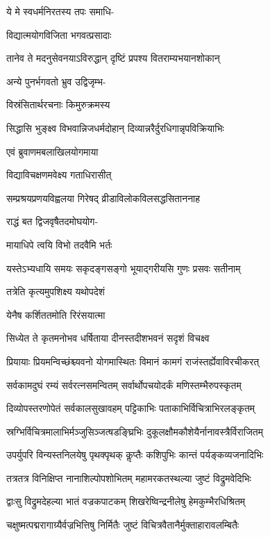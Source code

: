 ये मे स्वधर्मनिरतस्य तपः समाधि-

विद्यात्मयोगविजिता भगवत्प्रसादाः

\twolineshloka
{तानेव ते मदनुसेवनयाऽविरुद्धान्}
{दृष्टिं प्रपश्य वितराम्यभयानशोकान्}%

अन्ये पुनर्भगवतो भ्रुव उद्विजृम्भ-

विस्रंसितार्थरचनाः किमुरुक्रमस्य

\twolineshloka
{सिद्धासि भुङ्क्ष्व विभवान्निजधर्मदोहान्}
{दिव्यान्नरैर्दुरधिगान्नृपविक्रियाभिः}%

एवं ब्रुवाणमबलाखिलयोगमाया

विद्याविचक्षणमवेक्ष्य गताधिरासीत्

\twolineshloka
{सम्प्रश्रयप्रणयविह्वलया गिरेषद्}
{व्रीडाविलोकविलसद्धसिताननाह}%


राद्धं बत द्विजवृषैतदमोघयोग-

मायाधिपे त्वयि विभो तदवैमि भर्तः

\twolineshloka
{यस्तेऽभ्यधायि समयः सकृदङ्गसङ्गो}
{भूयाद्गरीयसि गुणः प्रसवः सतीनाम्}%

तत्रेति कृत्यमुपशिक्ष्य यथोपदेशं

येनैष कर्शिततमोति रिरंसयात्मा

\twolineshloka
{सिध्येत ते कृतमनोभव धर्षिताया}
{दीनस्तदीशभवनं सदृशं विचक्ष्व}%


\twolineshloka
{प्रियायाः प्रियमन्विच्छंश्च्यवनो योगमास्थितः}
{विमानं कामगं राजंस्तर्ह्येवाविरचीकरत्}%

\twolineshloka
{सर्वकामदुघं रम्यं सर्वरत्नसमन्वितम्}
{सर्वार्थोपचयोदर्कं मणिस्तम्भैरुपस्कृतम्}%

\twolineshloka
{दिव्योपस्तरणोपेतं सर्वकालसुखावहम्}
{पट्टिकाभिः पताकाभिर्विचित्राभिरलङ्कृतम्}%

\twolineshloka
{स्रग्भिर्विचित्रमालाभिर्मञ्जुसिञ्जत्षडङ्घ्रिभिः}
{दुकूलक्षौमकौशेयैर्नानावस्त्रैर्विराजितम्}%

\twolineshloka
{उपर्युपरि विन्यस्तनिलयेषु पृथक्पृथक्}
{कॢप्तैः कशिपुभिः कान्तं पर्यङ्कव्यजनादिभिः}%

\twolineshloka
{तत्रतत्र विनिक्षिप्त नानाशिल्पोपशोभितम्}
{महामरकतस्थल्या जुष्टं विद्रुमवेदिभिः}%

\twolineshloka
{द्वाःसु विद्रुमदेहल्या भातं वज्रकपाटकम्}
{शिखरेष्विन्द्रनीलेषु हेमकुम्भैरधिश्रितम्}%

\twolineshloka
{चक्षुष्मत्पद्मरागाग्र्यैर्वज्रभित्तिषु निर्मितैः}
{जुष्टं विचित्रवैतानैर्मुक्ताहारावलम्बितैः}%

